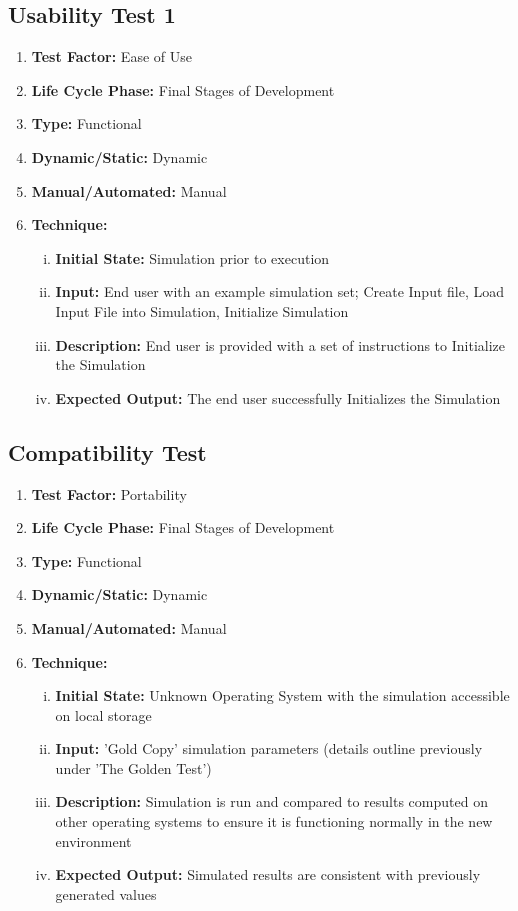 \documentclass[paper=letter, fontsize=10pt]{scrartcl}
\numberwithin{equation}{section}		%
\numberwithin{figure}{section}			%
\numberwithin{table}{section}				%
\begin{document}
\subsection{Usability Test 1}
\begin{enumerate}[]
	\item \textbf{Test Factor:} Ease of Use
	\item \textbf{Life Cycle Phase:} Final Stages of Development
	\item \textbf{Type:} Functional
	\item \textbf{Dynamic/Static:} Dynamic
	\item \textbf{Manual/Automated:} Manual
	\item \textbf{Technique:}
		\begin{enumerate}[(i)]
			\item \textbf{Initial State:} Simulation prior to execution  
			\item \textbf{Input:} End user with an example simulation set; Create Input file, Load Input File into Simulation, Initialize Simulation
			\item \textbf{Description:} End user is provided with a set of instructions to Initialize the Simulation 
			\item \textbf{Expected Output:} The end user successfully Initializes the Simulation
		\end{enumerate}
\end{enumerate}

\subsection{Compatibility Test}
\begin{enumerate}[] 
	\item \textbf{Test Factor:} Portability 
	\item \textbf{Life Cycle Phase:} Final Stages of Development
	\item \textbf{Type:} Functional
	\item \textbf{Dynamic/Static:} Dynamic
	\item \textbf{Manual/Automated:} Manual
	\item \textbf{Technique:}
		\begin{enumerate}[(i)]
			\item \textbf{Initial State:} Unknown Operating System with the simulation accessible on local storage  
			\item \textbf{Input:} 'Gold Copy' simulation parameters (details outline previously under 'The Golden Test')
			\item \textbf{Description:} Simulation is run and compared to results computed on other operating systems to ensure it is functioning normally in the new environment
			\item \textbf{Expected Output:} Simulated results are consistent with previously generated values
		\end{enumerate}
\end{enumerate}
\end{document}

